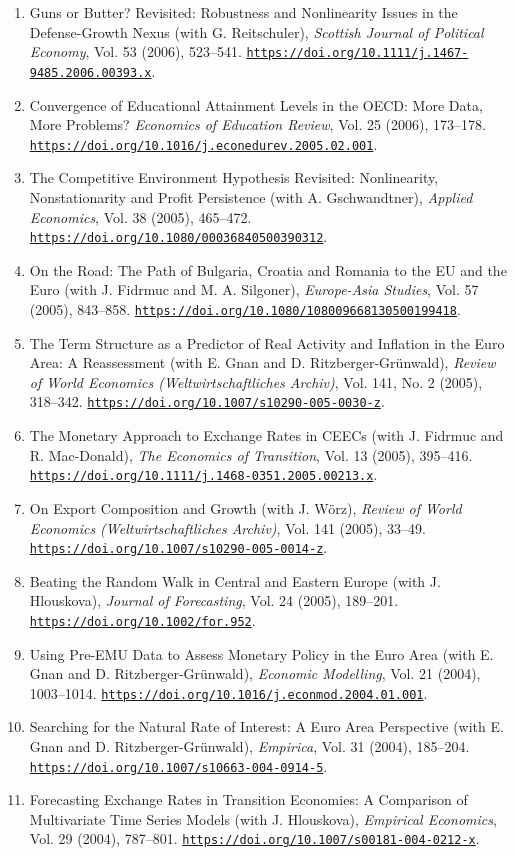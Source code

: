 \documentclass[10pt]{res} %
\newcommand{\doiurl}[1]{\href{https://doi.org/#1}{\nolinkurl{https://doi.org/#1}}}
\begin{document}
\begin{resume}
\begin{enumerate}
\item Guns or Butter? Revisited: Robustness and Nonlinearity Issues in the Defense-Growth Nexus (with G. Reitschuler), \textit{Scottish Journal of Political Economy}, Vol. 53 (2006), 523--541. \doiurl{10.1111/j.1467-9485.2006.00393.x}.
\item Convergence of Educational Attainment Levels in the OECD: More Data, More Problems? \textit{Economics of Education Review}, Vol. 25 (2006), 173--178. \doiurl{10.1016/j.econedurev.2005.02.001}.
\item The Competitive Environment Hypothesis Revisited: Nonlinearity, Nonstationarity and Profit Persistence (with A. Gschwandtner), \textit{Applied Economics}, Vol. 38 (2005), 465--472. \doiurl{10.1080/00036840500390312}.
\item On the Road: The Path of Bulgaria, Croatia and Romania to the EU and the Euro (with J. Fidrmuc and M. A. Silgoner), \textit{Europe-Asia Studies}, Vol. 57 (2005), 843--858. \doiurl{10.1080/108009668130500199418}.
\item The Term Structure as a Predictor of Real Activity and Inflation in the Euro Area: A Reassessment (with E. Gnan and D. Ritzberger-Gr\"unwald), \textit{Review of World Economics (Weltwirtschaftliches Archiv)}, Vol. 141, No. 2 (2005), 318--342. \doiurl{10.1007/s10290-005-0030-z}.
\item The Monetary Approach to Exchange Rates in CEECs (with J. Fidrmuc and R. Mac-Donald), \textit{The Economics of Transition}, Vol. 13 (2005), 395--416. \doiurl{10.1111/j.1468-0351.2005.00213.x}.
\item On Export Composition and Growth (with J. W\"orz), \textit{Review of World Economics (Weltwirtschaftliches Archiv)}, Vol. 141 (2005), 33--49. \doiurl{10.1007/s10290-005-0014-z}.
\item Beating the Random Walk in Central and Eastern Europe (with J. Hlouskova), \textit{Journal of Forecasting}, Vol. 24 (2005), 189--201. \doiurl{10.1002/for.952}.
\item Using Pre-EMU Data to Assess Monetary Policy in the Euro Area (with E. Gnan and D. Ritzberger-Gr\"unwald), \textit{Economic Modelling}, Vol. 21 (2004), 1003--1014. \doiurl{10.1016/j.econmod.2004.01.001}.
\item Searching for the Natural Rate of Interest: A Euro Area Perspective (with E. Gnan and D. Ritzberger-Gr\"unwald), \textit{Empirica}, Vol. 31 (2004), 185--204. \doiurl{10.1007/s10663-004-0914-5}.
\item Forecasting Exchange Rates in Transition Economies: A Comparison of Multivariate Time Series Models (with J. Hlouskova), \textit{Empirical Economics}, Vol. 29 (2004), 787--801. \doiurl{10.1007/s00181-004-0212-x}.

\end{enumerate}
\end{resume}
\end{document}
